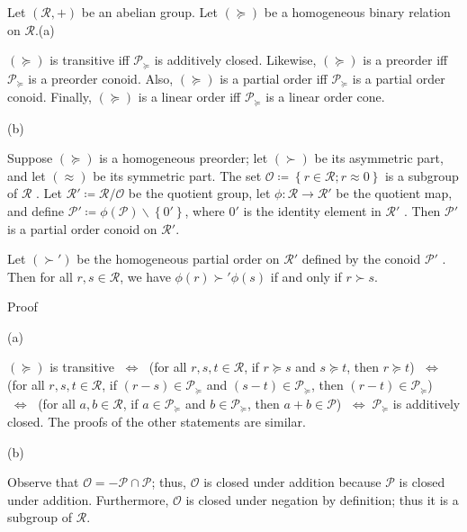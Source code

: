 \documentclass[
]{article}
\begin{document}
Let \(\left( \mathcal{R}, + \right)\) be an abelian group. Let
\(( \succeq )\) be a homogeneous binary relation on \(\mathcal{R}\).(a)

\(( \succeq )\) is transitive iff \(\mathcal{P}_{\succeq}\) is
additively closed. Likewise, \(( \succeq )\) is a preorder iff
\(\mathcal{P}_{\succeq}\) is a preorder conoid. Also, \(( \succeq )\) is
a partial order iff \(\mathcal{P}_{\succeq}\) is a partial order conoid.
Finally, \(( \succeq )\) is a linear order iff \(\mathcal{P}_{\succeq}\)
is a linear order cone.

(b)

Suppose \(( \succeq )\) is a homogeneous preorder; let \(( \succ )\) be
its asymmetric part, and let \(( \approx )\) be its symmetric part. The
set \(\mathcal{O} ≔ \left\{ r \in \mathcal{R};r \approx 0 \right\}\) is
a subgroup of \(\mathcal{R}\) . Let
\(\mathcal{R}' ≔ \mathcal{R}/\mathcal{O}\) be the quotient group, let
\(\left. \phi:\mathcal{R}\longrightarrow\mathcal{R}' \right.\) be the
quotient map, and define
\(\mathcal{P}' ≔ \phi\left( \mathcal{P} \right) \smallsetminus \left\{ 0' \right\}\),
where \(0'\) is the identity element in \(\mathcal{R}'\) . Then
\(\mathcal{P}'\) is a partial order conoid on \(\mathcal{R}'\).

Let \(\left( \succ ' \right)\) be the homogeneous partial order on
\(\mathcal{R}'\) defined by the conoid \(\mathcal{P}'\) . Then for all
\(r,s \in \mathcal{R}\), we have \(\phi(r) \succ '\phi(s)\) if and only
if \(r \succ s\).

Proof

(a)

\(( \succeq )\) is transitive \(\left. \;\Longleftrightarrow\; \right.\)
(for all \(r,s,t \in \mathcal{R}\), if \(r \succeq s\) and
\(s \succeq t\), then \(r \succeq t\))
\(\left. \;\Longleftrightarrow\; \right.\) (for all
\(r,s,t \in \mathcal{R}\), if \((r - s) \in \mathcal{P}_{\succeq}\) and
\((s - t) \in \mathcal{P}_{\succeq}\), then
\((r - t) \in \mathcal{P}_{\succeq}\))
\(\left. \;\Longleftrightarrow\; \right.\) (for all
\(a,b \in \mathcal{R}\), if \(a \in \mathcal{P}_{\succeq}\) and
\(b \in \mathcal{P}_{\succeq}\), then \(a + b \in \mathcal{P}\))
\(\left. \;\Longleftrightarrow\;\mathcal{P}_{\succeq} \right.\) is
additively closed. The proofs of the other statements are similar.

(b)

Observe that \(\mathcal{O} = - \mathcal{P} \cap \mathcal{P}\); thus,
\(\mathcal{O}\) is closed under addition because \(\mathcal{P}\) is
closed under addition. Furthermore, \(\mathcal{O}\) is closed under
negation by definition; thus it is a subgroup of \(\mathcal{R}\).
\end{document}
